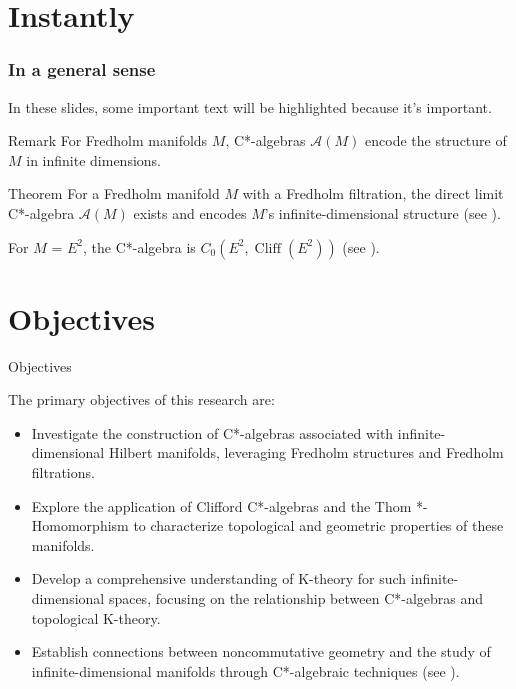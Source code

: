 \documentclass{beamer}
\begin{document}
\section{Instantly}
\begin{frame}
\frametitle{In a general sense}
In these slides, some important text will be
\alert{highlighted} because it's important.

\begin{block}{Remark}
For Fredholm manifolds \( M \), C*-algebras \( \mathcal{A}(M) \) encode the structure of \( M \) in infinite dimensions.
\end{block}
\pause
\begin{alertblock}{Theorem} 
For a Fredholm manifold \( M \) with a Fredholm filtration, the direct limit C*-algebra \( \mathcal{A}(M) \) exists and encodes \( M \)'s infinite-dimensional structure (see {\color{blue}\cite{higson2001}}).
\end{alertblock}
\pause
\begin{examples}
For \( M \) = \( E^{2} \), the C*-algebra is \( C_{0}(E^{2}, \operatorname{Cliff}(E^{2})) \) (see {\color{blue}\cite{trout1984}}).
\end{examples}
\end{frame}
\section{Objectives}
\begin{frame}{Objectives}
    \parbox{\textwidth}{
        The primary objectives of this research are:
        \begin{itemize}
            \item Investigate the construction of C*-algebras associated with infinite-dimensional Hilbert manifolds, leveraging Fredholm structures and Fredholm filtrations.
            \item Explore the application of Clifford C*-algebras and the Thom *-Homomorphism to characterize topological and geometric properties of these manifolds.
            \item Develop a comprehensive understanding of K-theory for such infinite-dimensional spaces, focusing on the relationship between C*-algebras and topological K-theory.
            \item Establish connections between noncommutative geometry and the study of infinite-dimensional manifolds through C*-algebraic techniques (see {\color{blue}\cite{tromba1988}}).
        \end{itemize}
    }
\end{frame}
\end{document}
